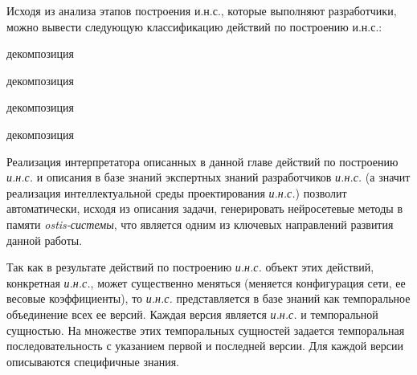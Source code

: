 Исходя из анализа этапов построения и.н.с., которые выполняют разработчики, можно вывести следующую классификацию действий по построению и.н.с.:

\begin{SCn}
	\begin{scnrelfromset}{декомпозиция}
		\begin{scnrelfromset}{декомпозиция}
		\end{scnrelfromset}

		\begin{scnrelfromset}{декомпозиция}
		\end{scnrelfromset}

		\begin{scnrelfromset}{декомпозиция}
		\end{scnrelfromset}
	\end{scnrelfromset}
\end{SCn}

Реализация интерпретатора описанных в данной главе действий по построению \textit{и.н.с.} и описания в базе знаний экспертных знаний разработчиков\textit{ и.н.с.} (а значит реализация интеллектуальной среды проектирования \textit{и.н.с.}) позволит автоматически, исходя из описания задачи, генерировать нейросетевые методы в памяти \textit{ostis-системы}, что является одним из ключевых направлений развития данной работы.

Так как в результате действий по построению \textit{и.н.с.} объект этих действий, конкретная \textit{и.н.с.}, может существенно меняться (меняется конфигурация сети, ее весовые коэффициенты), то \textit{и.н.с.} представляется в базе знаний как темпоральное объединение всех ее версий. Каждая версия является \textit{и.н.с.} и темпоральной сущностью. На множестве этих темпоральных сущностей задается темпоральная последовательность с указанием первой и последней версии. Для каждой версии описываются специфичные знания.

